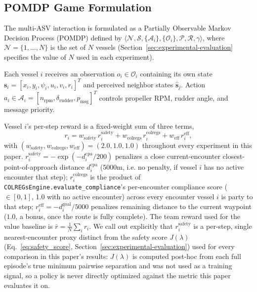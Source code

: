 \documentclass[journal,twocolumn,10pt]{IEEEtran}
\begin{document}
\subsection{POMDP Game Formulation}
The multi-ASV interaction is formulated as a Partially Observable Markov Decision Process (POMDP) defined by $\langle \mathcal{N}, \mathcal{S}, \{\mathcal{A}_i\}, \{\mathcal{O}_i\}, \mathcal{P}, \mathcal{R}, \gamma \rangle$, where $\mathcal{N} = \{1, \dots, N\}$ is the set of $N$ vessels (Section~\ref{sec:experimental-evaluation} specifies the value of $N$ used in each experiment).

Each vessel $i$ receives an observation $o_i \in \mathcal{O}_i$ containing its own state $\mathbf{s}_i = [x_i, y_i, \psi_i, u_i, v_i, r_i]^T$ and perceived neighbor states $\hat{\mathbf{s}}_j$. Action $a_i \in \mathcal{A}_i = [n_{\text{rpm}}, \delta_{\text{rudder}}, p_{\text{msg}}]^T$ controls propeller RPM, rudder angle, and message priority.

Vessel $i$'s per-step reward is a fixed-weight sum of three terms,
\begin{equation}
r_i = w_{\text{safety}} \, r_i^{\text{safety}} + w_{\text{colregs}} \, r_i^{\text{colregs}} + w_{\text{eff}} \, r_i^{\text{eff}},
\label{eq:reward}
\end{equation}
with $(w_{\text{safety}}, w_{\text{colregs}}, w_{\text{eff}}) = (2.0, 1.0, 1.0)$ throughout every experiment in this paper. $r_i^{\text{safety}} = -\exp(-d^{\text{cpa}}_i / 200)$ penalizes a close current-encounter closest-point-of-approach distance $d^{\text{cpa}}_i$ (5000m, i.e. no penalty, if vessel $i$ has no active encounter that step); $r_i^{\text{colregs}}$ is the product of \texttt{COLREGsEngine.evaluate\_compliance}'s per-encounter compliance score ($\in[0,1]$, 1.0 with no active encounter) across every encounter vessel $i$ is party to that step; $r_i^{\text{eff}} = -d^{\text{goal}}_i / 5000$ penalizes remaining distance to the current waypoint ($1.0$, a bonus, once the route is fully complete). The team reward used for the value baseline is $\bar{r} = \frac{1}{N}\sum_i r_i$. We call out explicitly that $r_i^{\text{safety}}$ is a per-step, single nearest-encounter proxy distinct from the safety score $J(\lambda)$ (Eq.~\ref{eq:safety_score}, Section~\ref{sec:experimental-evaluation}) used for every comparison in this paper's results: $J(\lambda)$ is computed post-hoc from each full episode's true minimum pairwise separation and was not used as a training signal, so a policy is never directly optimized against the metric this paper evaluates it on.
\end{document}
